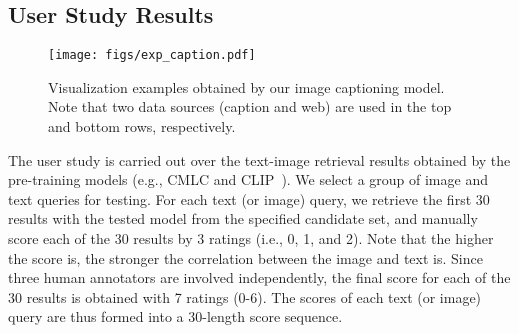 \documentclass[10pt,twocolumn,letterpaper]{article}
\begin{document}
\subsection{User Study Results}

\begin{table}[t]
    \centering
    \caption{User study results for the text-image retrieval downstream task. Three human annotators are involved in such user study. }
    \vspace{0.03in}
    \label{tab:user_study}
    \footnotesize
\end{table}

\begin{figure}[t]
    \centering
    \texttt{[image: figs/exp\_caption.pdf]}
\caption{
    Visualization examples obtained by our image captioning model. Note that two data sources (caption and web) are used in the top and bottom rows, respectively. }
    \label{fig:exp_caption}
\end{figure}

The user study is carried out over the text-image retrieval results obtained by the pre-training models (e.g., CMLC and CLIP~\cite{radford2021learning}). We select a group of image and text queries for testing. For each text (or image) query, we retrieve the first 30 results with the tested model from the specified candidate set, and manually score each of the 30 results by 3 ratings (i.e., 0, 1, and 2). Note that the higher the score is, the stronger the correlation between the image and text is. Since three human annotators are involved independently, the final score for each of the 30 results is obtained with 7 ratings (0-6). The scores of each text (or image) query are thus formed into a 30-length score sequence. 
\end{document}

